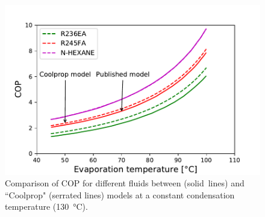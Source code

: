 \documentclass[a4paper,12pt]{article}
\begin{document}
 \begin{figure}[H]
  \centering
  \includegraphics[scale = 0.65]{Images/COP_HP_SA.pdf}
  \caption{Comparison of COP for different fluids between \cite{YU2018330} (solid~lines) and ``Coolprop" (serrated lines) models at a constant condensation temperature (\SI{130}{\celsius}).}\label{fig:COP_SA}
  
\end{figure}
\end{document}
